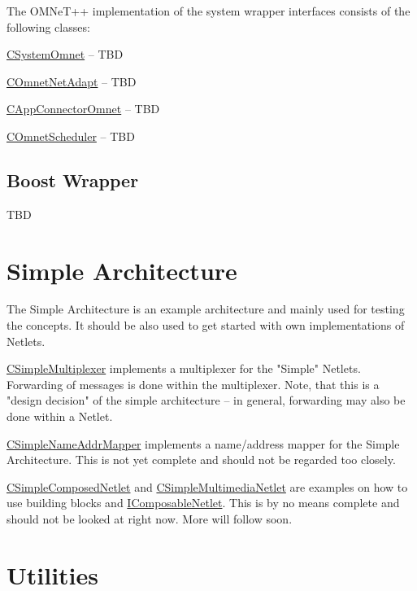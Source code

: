 The OMNeT++ implementation of the system wrapper interfaces consists of the following classes:

\hyperlink{classCSystemOmnet}{CSystemOmnet} -- TBD

\hyperlink{classCOmnetNetAdapt}{COmnetNetAdapt} -- TBD

\hyperlink{classCAppConnectorOmnet}{CAppConnectorOmnet} -- TBD

\hyperlink{classCOmnetScheduler}{COmnetScheduler} -- TBD


\subsection{Boost Wrapper}
\label{ch:noanex:wrapper:boost}

TBD


\section{Simple Architecture}
\label{ch:noanex:simpleArch}

The Simple Architecture is an example architecture and mainly used for testing the concepts. It should be also used to get started with own implementations of Netlets.

\hyperlink{classCSimpleMultiplexer}{CSimpleMultiplexer} implements a multiplexer for the "Simple" Netlets. Forwarding of messages is done within the multiplexer. Note, that this is a "design decision" of the simple architecture -- in general, forwarding may also be done within a Netlet.

\hyperlink{classCSimpleNameAddrMapper}{CSimpleNameAddrMapper} implements a name/address mapper for the Simple Architecture. This is not yet complete and should not be regarded too closely.

\hyperlink{classCSimpleComposedNetlet}{CSimpleComposedNetlet} and \hyperlink{classCSimpleMultimediaNetlet}{CSimpleMultimediaNetlet} are examples on how to use building blocks and \hyperlink{classIComposableNetlet}{IComposableNetlet}. This is by no means complete and should not be looked at right now. More will follow soon.

\section{Utilities}
\label{ch:noanex:util}

